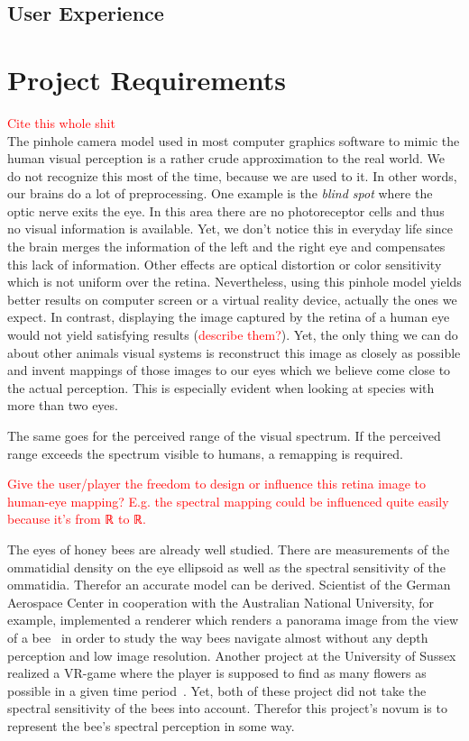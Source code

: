 \documentclass{acm_proc_article-sp}
\newcommand{\todo}[1]{\textcolor{Red}{#1}}
\begin{document}
\subsection{User Experience}

\section{Project Requirements}
\todo{Cite this whole shit}\\
The pinhole camera model used in most computer graphics software to mimic
the human visual perception is a rather crude approximation to the real world.
We do not recognize this most of the time, because we are used to it. In other
words, our brains do a lot of preprocessing.
One example is the \emph{blind spot} where the optic nerve exits the eye.
In this area there are no photoreceptor cells and thus no visual information is
available. Yet, we don't notice this in everyday life since the brain merges
the information of the left and the right eye and compensates this lack of
information. Other effects are optical distortion or color sensitivity which
is not uniform over the retina.
Nevertheless, using this pinhole model yields better results on computer screen
or a virtual reality device, actually the ones we expect. In contrast,
displaying the image captured by the retina of a human eye would not yield
satisfying results (\todo{describe them?}).
Yet, the only thing we can do about other animals visual systems is reconstruct
this image as closely as possible and invent mappings of those images to our
eyes which we believe come close to the actual perception.
This is especially evident when looking at species with more than two eyes.

The same goes for the perceived range of the visual spectrum. If the perceived
range exceeds the spectrum visible to humans, a remapping is required.

\todo{Give the user/player the freedom to design or influence this retina image
to human-eye mapping? E.g. the spectral mapping could be influenced quite easily
because it's from ℝ to ℝ.}

The eyes of honey bees are already well studied. There are measurements
of the ommatidial density on the eye ellipsoid as well as the spectral
sensitivity of the ommatidia. Therefor an accurate model can be derived.
Scientist of the German Aerospace Center in cooperation with the Australian
National University, for example, implemented a renderer
which renders a panorama image from the view of a bee \cite{insectvision}
in order to study the way bees navigate almost without any depth perception and
low image resolution.
Another project at the University of Sussex realized a VR-game where the
player is supposed to find as many flowers as possible in a given time
period \cite{beepilot}.
Yet, both of these project did not take the spectral sensitivity of the bees
into account. Therefor this project's novum is to represent the bee's spectral
perception in some way.
\end{document}
